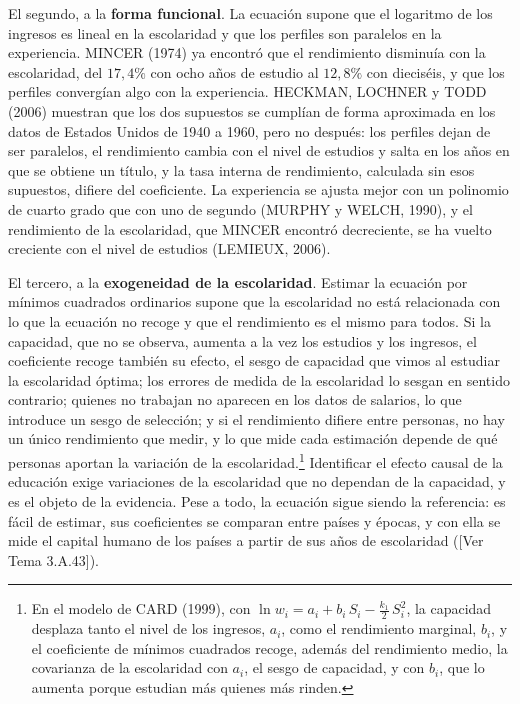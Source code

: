 \documentclass[10pt,a4paper]{article}
\newcommand{\authorfont}[1]{{\fontfamily{EBGaramond-TLF}\selectfont #1}}
\begin{document}
El segundo, a la \textbf{forma funcional}. La ecuación supone que el logaritmo de los ingresos es lineal en la escolaridad y que los perfiles son paralelos en la experiencia. MINCER (1974) ya encontró que el rendimiento disminuía con la escolaridad, del $17{,}4\%$ con ocho años de estudio al $12{,}8\%$ con dieciséis, y que los perfiles convergían algo con la experiencia. HECKMAN, LOCHNER y TODD (2006) muestran que los dos supuestos se cumplían de forma aproximada en los datos de Estados Unidos de 1940 a 1960, pero no después: los perfiles dejan de ser paralelos, el rendimiento cambia con el nivel de estudios y salta en los años en que se obtiene un título, y la tasa interna de rendimiento, calculada sin esos supuestos, difiere del coeficiente. La experiencia se ajusta mejor con un polinomio de cuarto grado que con uno de segundo (MURPHY y WELCH, 1990), y el rendimiento de la escolaridad, que MINCER encontró decreciente, se ha vuelto creciente con el nivel de estudios (LEMIEUX, 2006).

El tercero, a la \textbf{exogeneidad de la escolaridad}. Estimar la ecuación por mínimos cuadrados ordinarios supone que la escolaridad no está relacionada con lo que la ecuación no recoge y que el rendimiento es el mismo para todos. Si la capacidad, que no se observa, aumenta a la vez los estudios y los ingresos, el coeficiente recoge también su efecto, el sesgo de capacidad que vimos al estudiar la escolaridad óptima; los errores de medida de la escolaridad lo sesgan en sentido contrario; quienes no trabajan no aparecen en los datos de salarios, lo que introduce un sesgo de selección; y si el rendimiento difiere entre personas, no hay un único rendimiento que medir, y lo que mide cada estimación depende de qué personas aportan la variación de la escolaridad.\footnote{%
    En el modelo de CARD (1999), con $\ln w_i=a_i+b_i\,S_i-\tfrac{k_1}{2}\,S_i^2$, la capacidad desplaza tanto el nivel de los ingresos, $a_i$, como el rendimiento marginal, $b_i$, y el coeficiente de mínimos cuadrados recoge, además del rendimiento medio, la covarianza de la escolaridad con $a_i$, el sesgo de capacidad, y con $b_i$, que lo aumenta porque estudian más quienes más rinden.
} Identificar el efecto causal de la educación exige variaciones de la escolaridad que no dependan de la capacidad, y es el objeto de la evidencia. Pese a todo, la ecuación sigue siendo la referencia: es fácil de estimar, sus coeficientes se comparan entre países y épocas, y con ella se mide el capital humano de los países a partir de sus años de escolaridad ([\authorfont{Ver Tema 3.A.43}]).
\end{document}
